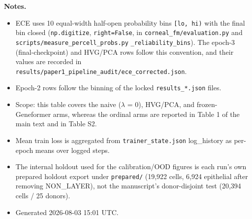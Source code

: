 \documentclass[12pt,a4paper]{article}
\begin{document}
\medskip
\begingroup
\small
\centering
{}
\endgroup

\textbf{Notes.}
\begin{itemize}
  \item ECE uses 10 equal-width half-open probability bins \texttt{[lo, hi)} with the final bin closed (\texttt{np.digitize}, \texttt{right=False}, in \texttt{corneal\_fm/evaluation.py} and \texttt{scripts/measure\_percell\_probs.py} \texttt{\_reliability\_bins}). The epoch-3 (final-checkpoint) and HVG/PCA rows follow this convention, and their values are recorded in \texttt{results/paper1\_pipeline\_audit/ece\_corrected.json}.
  \item Epoch-2 rows follow the binning of the locked \texttt{results\_*.json} files.
  \item Scope: this table covers the naive ($\lambda$ = 0), HVG/PCA, and frozen-Geneformer arms, whereas the ordinal arms are reported in Table 1 of the main text and in Table S2.
  \item Mean train loss is aggregated from \texttt{trainer\_state.json} log\_history as per-epoch means over logged steps.
  \item The internal holdout used for the calibration/OOD figures is each run's own prepared holdout export under \texttt{prepared/} (19,922 cells, 6,924 epithelial after removing NON\_LAYER), not the manuscript's donor-disjoint test (20,394 cells / 25 donors).
  \item Generated 2026-08-03 15:01 UTC.
\end{itemize}
\end{document}
